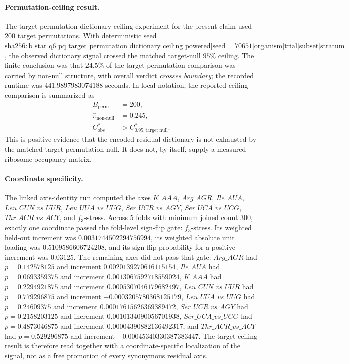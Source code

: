 \paragraph{Permutation-ceiling result.}
The target-permutation dictionary-ceiling experiment for the present claim used $200$ target permutations.  With deterministic seed $\mathrm{sha256{:}b\_star\_q6\_pq\_target\_permutation\_dictionary\_ceiling\_powered|seed=70651|organism|trial|subset|stratum}$, the observed dictionary signal crossed the matched target-null $95\%$ ceiling.  The finite conclusion was that $24.5\%$ of the target-permutation comparison was carried by non-null structure, with overall verdict \emph{crosses boundary}; the recorded runtime was $441.9897983074188$ seconds.  In local notation, the reported ceiling comparison is summarized as
$$
\begin{aligned}
B_{\mathrm{perm}} &= 200,\\
\widehat{\pi}_{\mathrm{non\mbox{-}null}} &= 0.245,\\
C^{\ast}_{\mathrm{obs}} &> C^{\ast}_{0.95,\mathrm{target\ null}}.
\end{aligned}
$$
This is positive evidence that the encoded residual dictionary is not exhausted by the matched target permutation null.  It does not, by itself, supply a measured ribosome-occupancy matrix.

\paragraph{Coordinate specificity.}
The linked axis-identity run computed the axes $K\_AAA$, $Arg\_AGR$, $Ile\_AUA$, $Leu\_CUN\_vs\_UUR$, $Leu\_UUA\_vs\_UUG$, $Ser\_UCR\_vs\_AGY$, $Ser\_UCA\_vs\_UCG$, $Thr\_ACR\_vs\_ACY$, and $f_3\text{-stress}$.  Across $5$ folds with minimum joined count $300$, exactly one coordinate passed the fold-level sign-flip gate: $f_3\text{-stress}$.  Its weighted held-out increment was $0.0031744502294756994$, its weighted absolute unit loading was $0.5109586606724208$, and its sign-flip probability for a positive increment was $0.03125$.  The remaining axes did not pass that gate: $Arg\_AGR$ had $p=0.142578125$ and increment $0.0020139270616115154$, $Ile\_AUA$ had $p=0.0693359375$ and increment $0.0013067592718559024$, $K\_AAA$ had $p=0.2294921875$ and increment $0.0005307046179682497$, $Leu\_CUN\_vs\_UUR$ had $p=0.779296875$ and increment $-0.0003205780368125179$, $Leu\_UUA\_vs\_UUG$ had $p=0.24609375$ and increment $0.00017615626369389472$, $Ser\_UCR\_vs\_AGY$ had $p=0.2158203125$ and increment $0.0010134090056701938$, $Ser\_UCA\_vs\_UCG$ had $p=0.4873046875$ and increment $0.00004390882136492317$, and $Thr\_ACR\_vs\_ACY$ had $p=0.529296875$ and increment $-0.00045340330387383447$.  The target-ceiling result is therefore read together with a coordinate-specific localization of the signal, not as a free promotion of every synonymous residual axis.

